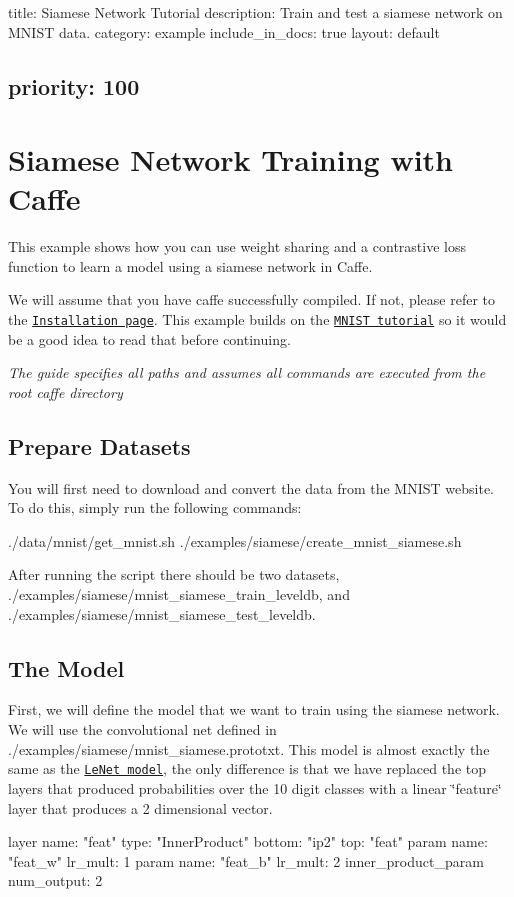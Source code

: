 

 title\+: Siamese Network Tutorial description\+: Train and test a siamese network on M\+N\+I\+ST data. category\+: example include\+\_\+in\+\_\+docs\+: true layout\+: default \subsection*{priority\+: 100 }

\section*{Siamese Network Training with Caffe}

This example shows how you can use weight sharing and a contrastive loss function to learn a model using a siamese network in Caffe.

We will assume that you have caffe successfully compiled. If not, please refer to the \href{../../installation.html}{\tt Installation page}. This example builds on the \href{mnist.html}{\tt M\+N\+I\+ST tutorial} so it would be a good idea to read that before continuing.

{\itshape The guide specifies all paths and assumes all commands are executed from the root caffe directory}

\subsection*{Prepare Datasets}

You will first need to download and convert the data from the M\+N\+I\+ST website. To do this, simply run the following commands\+: \begin{DoxyVerb}./data/mnist/get_mnist.sh
./examples/siamese/create_mnist_siamese.sh
\end{DoxyVerb}


After running the script there should be two datasets, {\ttfamily ./examples/siamese/mnist\+\_\+siamese\+\_\+train\+\_\+leveldb}, and {\ttfamily ./examples/siamese/mnist\+\_\+siamese\+\_\+test\+\_\+leveldb}.

\subsection*{The Model}

First, we will define the model that we want to train using the siamese network. We will use the convolutional net defined in {\ttfamily ./examples/siamese/mnist\+\_\+siamese.prototxt}. This model is almost exactly the same as the \href{mnist.html}{\tt Le\+Net model}, the only difference is that we have replaced the top layers that produced probabilities over the 10 digit classes with a linear \char`\"{}feature\char`\"{} layer that produces a 2 dimensional vector. \begin{DoxyVerb}layer {
  name: "feat"
  type: "InnerProduct"
  bottom: "ip2"
  top: "feat"
  param {
    name: "feat_w"
    lr_mult: 1
  }
  param {
    name: "feat_b"
    lr_mult: 2
  }
  inner_product_param {
    num_output: 2
  }
}
\end{DoxyVerb}


